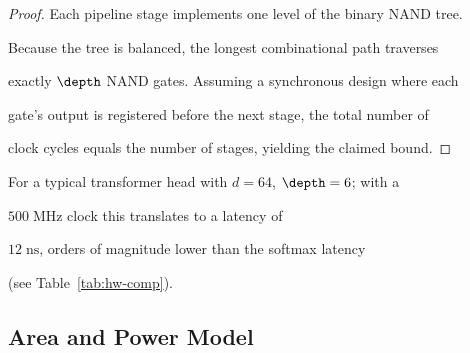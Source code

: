 \begin{proof}






Each pipeline stage implements one level of the binary NAND tree.






Because the tree is balanced, the longest combinational path traverses






exactly \(\depth\) NAND gates.  Assuming a synchronous design where each






gate’s output is registered before the next stage, the total number of






clock cycles equals the number of stages, yielding the claimed bound.






\end{proof}













For a typical transformer head with \(d=64\), \(\depth=6\); with a






\(500\;\text{MHz}\) clock this translates to a latency of






\(12\;\text{ns}\), orders of magnitude lower than the softmax latency






(see Table~\ref{tab:hw-comp}).













\subsection{Area and Power Model}







